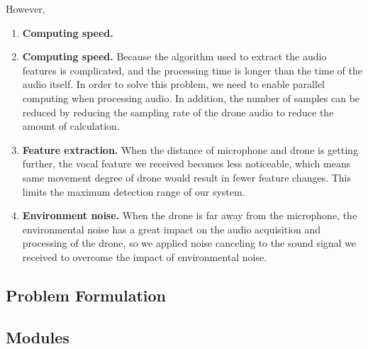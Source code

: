 \documentclass{sig-alternate-10pt}
\begin{document}
However, 

\begin{enumerate}
	\item \textbf{Computing speed.}
	
	\item \textbf{Computing speed.} Because the algorithm used to extract the audio features is complicated, and the processing time is longer than the time of the audio itself. In order to solve this problem, we need to enable parallel computing when processing audio. In addition, the number of samples can be reduced by reducing the sampling rate of the drone audio to reduce the amount of calculation.
	\item \textbf{Feature extraction.} When the distance of microphone and drone is getting further, the vocal feature we received becomes less noticeable, which means same movement degree of drone would result in fewer feature changes. This limits the maximum detection range of our system.
	\item \textbf{Environment noise.} When the drone is far away from the microphone, the environmental noise has a great impact on the audio acquisition and processing of the drone, so we applied noise canceling to the sound signal we received to overcome the impact of environmental noise.
\end{enumerate}

\subsection{Problem Formulation}


\subsection{Modules}
\end{document}
